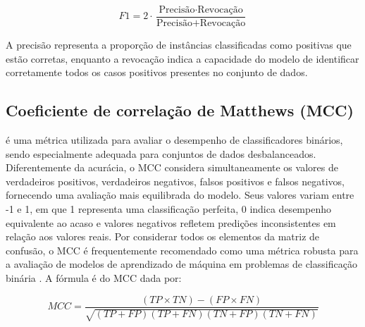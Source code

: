 \documentclass[
    12pt,                %
    openright,           %
    oneside,             %
    a4paper,             %
    english,             %
    brazil               %
]{abntex2}
\begin{document}
\begin{equation}
F1 = 2 \cdot \frac{\text{Precisão} \cdot \text{Revocação}}{\text{Precisão} + \text{Revocação}}
\end{equation}

A precisão representa a proporção de instâncias classificadas como positivas que estão corretas, enquanto a revocação indica a capacidade do modelo de identificar corretamente todos os casos positivos presentes no conjunto de dados.

\subsection{Coeficiente de correlação de Matthews (MCC)}
é uma métrica utilizada para avaliar o desempenho de classificadores binários, sendo especialmente adequada para conjuntos de dados desbalanceados. Diferentemente da acurácia, o MCC considera simultaneamente os valores de verdadeiros positivos, verdadeiros negativos, falsos positivos e falsos negativos, fornecendo uma avaliação mais equilibrada do modelo. Seus valores variam entre -1 e 1, em que 1 representa uma classificação perfeita, 0 indica desempenho equivalente ao acaso e valores negativos refletem predições inconsistentes em relação aos valores reais. Por considerar todos os elementos da matriz de confusão, o MCC é frequentemente recomendado como uma métrica robusta para a avaliação de modelos de aprendizado de máquina em problemas de classificação binária \cite{Chicco2023}. 
A fórmula é do MCC dada por:

\begin{equation}
MCC = \frac{(TP \times TN) - (FP \times FN)}
{\sqrt{(TP + FP)(TP + FN)(TN + FP)(TN + FN)}}
\label{eq:mcc}
\end{equation}






\end{document}
